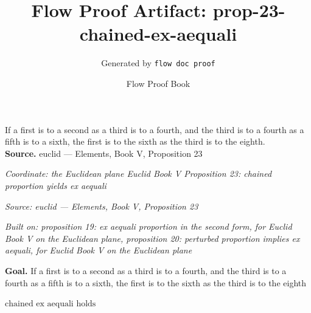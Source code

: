 \documentclass[11pt]{article}
\title{Flow Proof Artifact: prop-23-chained-ex-aequali}
\author{Generated by \texttt{flow doc proof}}
\date{Flow Proof Book}
\theoremstyle{definition}
\begin{document}
\maketitle
If a first is to a second as a third is to a fourth, and the third is to a fourth as a fifth is to a sixth, the first is to the sixth as the third is to the eighth.\\[0.5em]
\textbf{Source.} euclid — Elements, Book V, Proposition 23\\[0.5em]
\bigskip
{}\par
\smallskip\noindent\textit{Coordinate: the Euclidean plane \cdot Euclid Book V \cdot Proposition 23: chained proportion yields ex aequali}\par
\smallskip\noindent\textit{Source: euclid — Elements, Book V, Proposition 23}\par
\smallskip\noindent\textit{Built on: proposition 19: ex aequali proportion in the second form, for Euclid Book V on the Euclidean plane, proposition 20: perturbed proportion implies ex aequali, for Euclid Book V on the Euclidean plane}\par
\medskip
\noindent\textbf{Goal.} If a first is to a second as a third is to a fourth, and the third is to a fourth as a fifth is to a sixth, the first is to the sixth as the third is to the eighth\par
\noindent$\displaystyle \text{chained ex aequali holds}$\par
\medskip
\noindent
\end{document}
